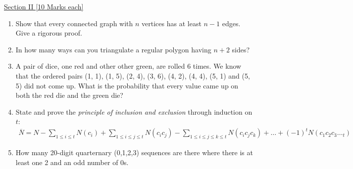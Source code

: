 \documentclass{article}
\begin{document}
\underline{\large{Section II \hspace*{10cm} [10 Marks each]}}
\begin{enumerate} 

 
 \item Show that every connected graph with $n$ vertices has at least $n-1$ edges. Give a rigorous proof.

\item In how many ways can you triangulate a regular polygon having $n+2$ sides?

\item  A pair of dice, one red and other other green, are rolled 6 times. We know that the ordered pairs (1, 1), (1, 5), (2, 4), (3, 6), (4, 2), (4, 4), (5, 1) and (5, 5) did not come up. What is the probability that every value came up on both the red die and the green die?

\item State and prove the \textit{principle of inclusion and exclusion} through induction on $t$:
\begin{align*}
\overline{N} = N - \sum_{1\leq i \leq t}N(c_i) + \sum_{1\leq i\leq j\leq t}N(c_ic_j) - \sum_{1\leq i\leq j\leq k\leq t}N(c_ic_jc_k) + \dots + (-1)^tN(c_1c_2c_3\dotsc_t)
\end{align*}


\item How many 20-digit quarternary (0,1,2,3) sequences are there where there is at least one 2 and an odd number of 0s.



\end{enumerate}
\end{document}
